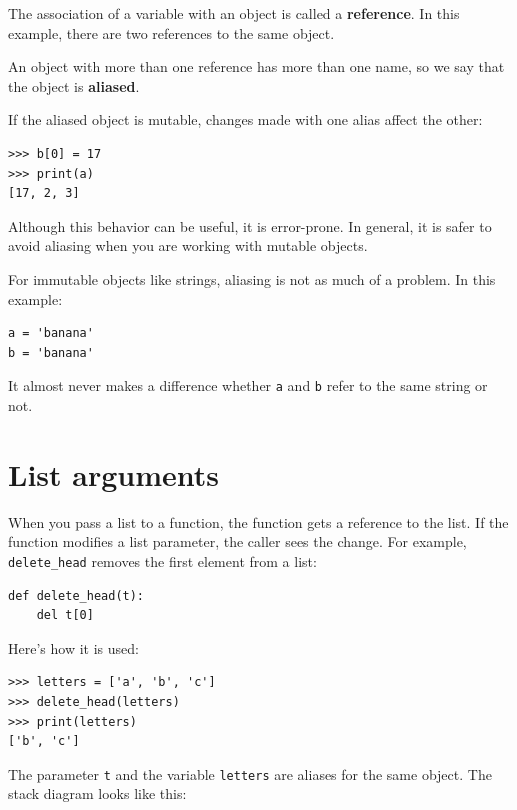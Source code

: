 \documentclass[10pt]{book}
\begin{document}
The association of a variable with an object is called a {\bf
reference}.  In this example, there are two references to the same
object.


An object with more than one reference has more
than one name, so we say that the object is {\bf aliased}.


If the aliased object is mutable, 
changes made with one alias affect
the other:

\beforeverb
\begin{verbatim}
>>> b[0] = 17
>>> print(a)
[17, 2, 3]
\end{verbatim}
\afterverb
%
Although this behavior can be useful, it is error-prone.  In general,
it is safer to avoid aliasing when you are working with mutable
objects.


For immutable objects like strings, aliasing is not as much of a
problem.  In this example:

\beforeverb
\begin{verbatim}
a = 'banana'
b = 'banana'
\end{verbatim}
\afterverb
%
It almost never makes a difference whether {\tt a} and {\tt b} refer
to the same string or not.


\section{List arguments}


When you pass a list to a function, the function gets a reference
to the list.
If the function modifies a list parameter, the caller sees the change.
For example, \verb"delete_head" removes the first element from a list:

\beforeverb
\begin{verbatim}
def delete_head(t):
    del t[0]
\end{verbatim}
\afterverb
%
Here's how it is used:

\beforeverb
\begin{verbatim}
>>> letters = ['a', 'b', 'c']
>>> delete_head(letters)
>>> print(letters)
['b', 'c']
\end{verbatim}
\afterverb
%
The parameter {\tt t} and the variable {\tt letters} are
aliases for the same object.  The stack diagram looks like
this:
\end{document}
